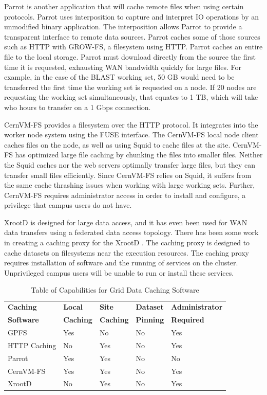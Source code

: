 Parrot \cite{thain2005parrot} is another application that will cache remote files when using certain protocols.  Parrot uses interposition \cite{thain2001multiple} to capture and interpret IO operations by an unmodified binary application.  The interposition allows Parrot to provide a transparent interface to remote data sources.  Parrot caches some of those sources such as HTTP with GROW-FS, a filesystem using HTTP.  Parrot caches an entire file to the local storage.  Parrot must download directly from the source the first time it is requested, exhausting WAN bandwidth quickly for large files.  For example, in the case of the BLAST working set, 50 GB would need to be transferred the first time the working set is requested on a node.  If 20 nodes are requesting the working set simultaneously, that equates to 1 TB, which will take who hours to transfer on a 1 Gbps connection.


CernVM-FS \cite{blomer2011cernvm} provides a filesystem over the HTTP protocol.  It integrates into the worker node system using the FUSE \cite{szeredi2010fuse} interface.  The CernVM-FS local node client caches files on the node, as well as using Squid to cache files at the site.  CernVM-FS has optimized large file caching by chunking the files into smaller files.  Neither the Squid caches nor the web servers optimally transfer large files, but they can transfer small files efficiently.  Since CernVM-FS relies on Squid, it suffers from the same cache thrashing issues when working with large working sets.  Further, CernVM-FS requires administrator access in order to install and configure, a privilege that campus users do not have.


XrootD \cite{dorigo2005xrootd} is designed for large data access, and it has even been used for WAN data transfers \cite{bauerdick2012using} using a federated data access topology.  There has been some work in creating a caching proxy for the XrootD \cite{bauerdick2014xrootd}.  The caching proxy is designed to cache datasets on filesystems near the execution resources.  The caching proxy requires installation of software and the running of services on the cluster.  Unprivileged campus users will be unable to run or install these services.

\begin{table}[h!t]
	\centering
	\bgroup
	\def\arraystretch{1.5}
	\begin{tabular}{l | l | l | l | l }
\textbf{Caching} & \textbf{Local} & \textbf{Site}  & \textbf{Dataset } & \textbf{Administrator} \\
\textbf{Software} & \textbf{Caching} & \textbf{Caching} & \textbf{Pinning} & \textbf{Required} \\ \hline
GPFS & Yes & No & No & Yes \\
HTTP Caching & No & Yes & No & Yes \\
Parrot & Yes & Yes & No & No \\
CernVM-FS & Yes & Yes & No & Yes \\
XrootD & No & Yes & No & Yes
	\end{tabular}
	\egroup
	\caption{Table of Capabilities for Grid Data Caching Software}
\end{table}

